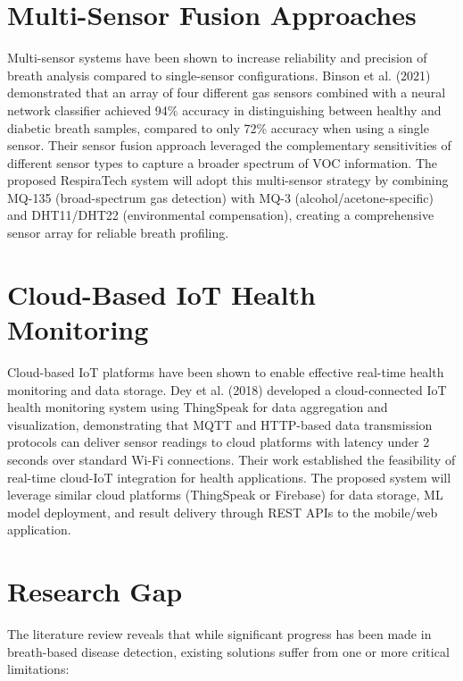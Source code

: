 \section{Multi-Sensor Fusion Approaches}
Multi-sensor systems have been shown to increase reliability and precision of breath analysis compared to single-sensor configurations. Binson et al. (2021) demonstrated that an array of four different gas sensors combined with a neural network classifier achieved 94\% accuracy in distinguishing between healthy and diabetic breath samples, compared to only 72\% accuracy when using a single sensor. Their sensor fusion approach leveraged the complementary sensitivities of different sensor types to capture a broader spectrum of VOC information. The proposed RespiraTech system will adopt this multi-sensor strategy by combining MQ-135 (broad-spectrum gas detection) with MQ-3 (alcohol/acetone-specific) and DHT11/DHT22 (environmental compensation), creating a comprehensive sensor array for reliable breath profiling.

\section{Cloud-Based IoT Health Monitoring}
Cloud-based IoT platforms have been shown to enable effective real-time health monitoring and data storage. Dey et al. (2018) developed a cloud-connected IoT health monitoring system using ThingSpeak for data aggregation and visualization, demonstrating that MQTT and HTTP-based data transmission protocols can deliver sensor readings to cloud platforms with latency under 2 seconds over standard Wi-Fi connections. Their work established the feasibility of real-time cloud-IoT integration for health applications. The proposed system will leverage similar cloud platforms (ThingSpeak or Firebase) for data storage, ML model deployment, and result delivery through REST APIs to the mobile/web application.

\section{Research Gap}
The literature review reveals that while significant progress has been made in breath-based disease detection, existing solutions suffer from one or more critical limitations:

